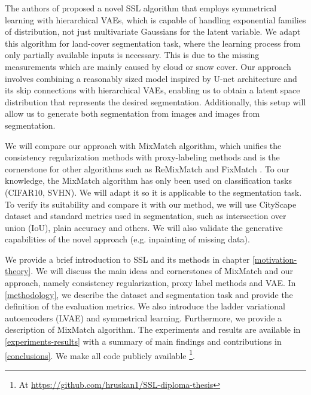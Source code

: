The authors of \cite{not-published} proposed a novel SSL algorithm that employs symmetrical learning with hierarchical VAEs, which is capable of
handling exponential families of distribution, not just multivariate Gaussians for the latent variable. We adapt this algorithm for  
land-cover segmentation task, where the learning process from only partially available inputs is necessary. This is due to the missing measurements 
which are mainly caused by cloud or snow cover. 
Our approach involves combining a reasonably sized model inspired by U-net architecture and its skip connections\cite{unet-2015} with hierarchical VAEs, enabling
us to obtain a latent space distribution that represents the desired segmentation. Additionally, this setup will allow us to generate both segmentation from images 
and images from segmentation.

We will compare our approach with MixMatch \cite{mixmatch-2019} algorithm, which unifies the consistency regularization methods with proxy-labeling
methods \cite{ssl-overview-2020} and is the cornerstone for other algorithms such as ReMixMatch \cite{remixmatch-2020} and FixMatch \cite{fixmatch-2020}.
To our knowledge, the MixMatch algorithm has only been used on classification tasks (CIFAR10, SVHN). We will adapt it so it is applicable
to the segmentation task. To verify its suitability and compare it with our method, we will use CityScape dataset and standard metrics used in 
segmentation, such as intersection over union (IoU), plain accuracy  and others. We will also validate the generative capabilities of the novel approach (e.g. 
inpainting of missing data).

We provide a brief introduction to SSL and its methods in chapter \ref{motivation-theory}. We will discuss the main ideas and cornerstones of 
MixMatch and our approach, namely consistency regularization, proxy label methods and VAE. In \ref{methodology}, we describe the dataset and 
segmentation task and provide the definition of the evaluation metrics. We also introduce the ladder variational autoencoders (LVAE) and 
symmetrical learning. Furthermore, we provide a description of MixMatch algorithm. The experiments and results are available in 
\ref{experiments-results} with a summary of main findings and contributions in \ref{conclusions}. We make all code publicly available
\footnote[2]{At \url{https://github.com/hruskan1/SSL-diploma-thesis}}. 



